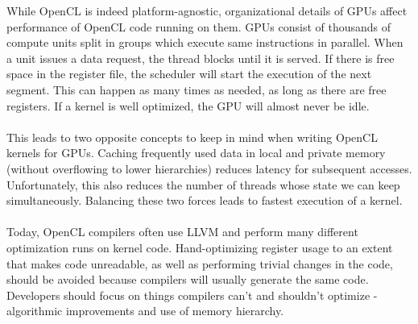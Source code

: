 While OpenCL is indeed platform-agnostic, organizational details of GPUs affect performance of OpenCL code running on them. GPUs consist of thousands of compute units split in groups which execute same instructions in parallel. When a unit issues a data request, the thread blocks until it is served. If there is free space in the register file, the scheduler will start the execution of the next segment. This can happen as many times as needed, as long as there are free registers. If a kernel is well optimized, the GPU will almost never be idle.\\
\\
This leads to two opposite concepts to keep in mind when writing OpenCL kernels for GPUs. Caching frequently used data in local and private memory (without overflowing to lower hierarchies) reduces latency for subsequent accesses. Unfortunately, this also reduces the number of threads whose state we can keep simultaneously. Balancing these two forces leads to fastest execution of a kernel.\\
\\
Today, OpenCL compilers often use LLVM and perform many different optimization runs on kernel code. Hand-optimizing register usage to an extent that makes code unreadable, as well as performing trivial changes in the code, should be avoided because compilers will usually generate the same code. Developers should focus on things compilers can't and shouldn't optimize - algorithmic improvements and use of memory hierarchy.
